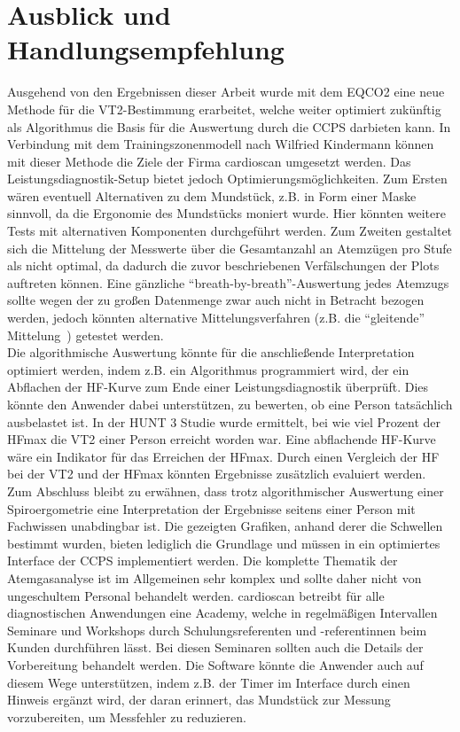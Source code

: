 \section{Ausblick und Handlungsempfehlung}
%
Ausgehend von den Ergebnissen dieser Arbeit wurde mit dem \gls{EQCO2} eine neue Methode für die VT2-Bestimmung erarbeitet, welche weiter optimiert zukünftig als Algorithmus die Basis für die Auswertung durch die \gls{CCPS} darbieten kann. In Verbindung mit dem Trainingszonenmodell nach Wilfried Kindermann können mit dieser Methode die Ziele der Firma cardioscan umgesetzt werden. Das Leistungsdiagnostik-Setup bietet jedoch Optimierungsmöglichkeiten. Zum Ersten wären eventuell Alternativen zu dem Mundstück, z.B. in Form einer Maske sinnvoll, da die Ergonomie des Mundstücks moniert wurde. Hier könnten weitere Tests mit alternativen Komponenten durchgeführt werden. Zum Zweiten gestaltet sich die Mittelung der Messwerte über die Gesamtanzahl an Atemzügen pro Stufe als nicht optimal, da dadurch die zuvor beschriebenen Verfälschungen der Plots auftreten können. Eine gänzliche "`breath-by-breath"'-Auswertung jedes Atemzugs sollte wegen der zu großen Datenmenge zwar auch nicht in Betracht bezogen werden, jedoch könnten alternative Mittelungsverfahren (z.B. die "`gleitende"' Mittelung~\cite{Kroidl.2015}) getestet werden.\\
Die algorithmische Auswertung könnte für die anschließende Interpretation optimiert werden, indem z.B. ein Algorithmus programmiert wird, der ein Abflachen der \gls{HF}-Kurve zum Ende einer Leistungsdiagnostik überprüft. Dies könnte den Anwender dabei unterstützen, zu bewerten, ob eine Person tatsächlich ausbelastet ist. In der HUNT 3 Studie wurde ermittelt, bei wie viel Prozent der \gls{HFmax} die VT2 einer Person erreicht worden war. Eine abflachende \gls{HF}-Kurve wäre ein Indikator für das Erreichen der \gls{HFmax}. Durch einen Vergleich der \gls{HF} bei der VT2 und der \gls{HFmax} könnten Ergebnisse zusätzlich evaluiert werden.\\
Zum Abschluss bleibt zu erwähnen, dass trotz algorithmischer Auswertung einer Spiroergometrie eine Interpretation der Ergebnisse seitens einer Person mit Fachwissen unabdingbar ist. Die gezeigten Grafiken, anhand derer die Schwellen bestimmt wurden, bieten lediglich die Grundlage und müssen in ein optimiertes Interface der \gls{CCPS} implementiert werden. Die komplette Thematik der Atemgasanalyse ist im Allgemeinen sehr komplex und sollte daher nicht von ungeschultem Personal behandelt werden. cardioscan betreibt für alle diagnostischen Anwendungen eine Academy, welche in regelmäßigen Intervallen Seminare und Workshops durch Schulungsreferenten und -referentinnen beim Kunden durchführen lässt. Bei diesen Seminaren sollten auch die Details der Vorbereitung behandelt werden. Die Software könnte die Anwender auch auf diesem Wege unterstützen, indem z.B. der Timer im Interface durch einen Hinweis ergänzt wird, der daran erinnert, das Mundstück zur Messung vorzubereiten, um Messfehler zu reduzieren.
%
\nocite{*}


%
\printbibliography

